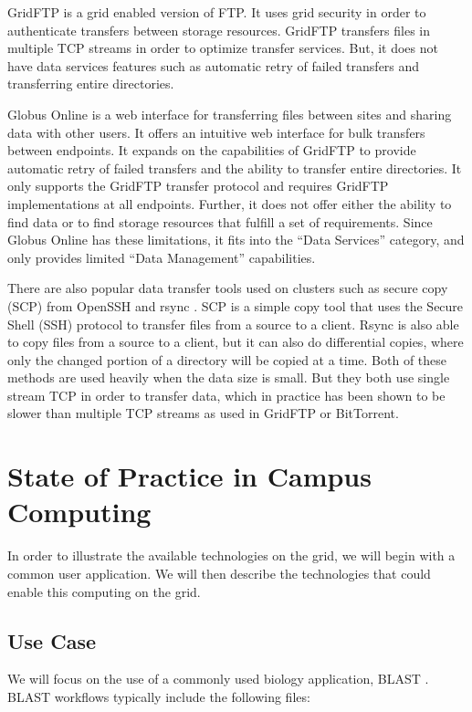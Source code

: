 GridFTP is a grid enabled version of FTP.  It uses grid security in order to authenticate transfers between storage resources.  GridFTP transfers files in multiple TCP streams in order to optimize transfer services.  But, it does not have data services features such as automatic retry of failed transfers and transferring entire directories.

Globus Online \cite{foster2011globus} is a web interface for transferring files between sites and sharing data with other users.  It offers an intuitive web interface for bulk transfers between endpoints. It expands on the capabilities of GridFTP to provide automatic retry of failed transfers and the ability to transfer entire directories.  It only supports the GridFTP \cite{allcock2005globus} transfer protocol and requires GridFTP implementations at all endpoints.  Further, it does not offer either the ability to find data or to find storage resources that fulfill a set of requirements.  Since Globus Online has these limitations, it fits into the ``Data Services'' category, and only provides limited ``Data Management'' capabilities.

There are also popular data transfer tools used on clusters such as secure copy (SCP) from OpenSSH \cite{openssh} and rsync \cite{rsynce}.  SCP is a simple copy tool that uses the Secure Shell (SSH) protocol to transfer files from a source to a client.  Rsync is also able to copy files from a source to a client, but it can also do differential copies, where only the changed portion of a directory will be copied at a time.  Both of these methods are used heavily when the data size is small.  But they both use single stream TCP in order to transfer data, which in practice has been shown to be slower than multiple TCP streams as used in GridFTP \cite{allcock2005globus} or BitTorrent.





\section{State of Practice in Campus Computing}
\label{sec:currentapproach}
In order to illustrate the available technologies on the grid, we will begin with a common user application.  We will then describe the technologies that could enable this computing on the grid.

\subsection{Use Case}
We will focus on the use of a commonly used biology application, BLAST \cite{altschul1990basic}.  BLAST workflows typically include the following files:

